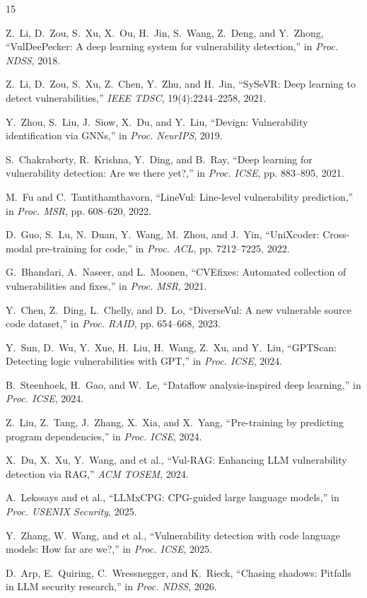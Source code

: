 \documentclass[10pt,twocolumn]{article}
\begin{document}
\footnotesize
\begin{thebibliography}{15}
\setlength{\itemsep}{0.2pt}
\setlength{\parskip}{0pt}

Z.~Li, D.~Zou, S.~Xu, X.~Ou, H.~Jin, S.~Wang, Z.~Deng, and Y.~Zhong, ``VulDeePecker: A deep learning system for vulnerability detection,'' in \emph{Proc. NDSS}, 2018.

Z.~Li, D.~Zou, S.~Xu, Z.~Chen, Y.~Zhu, and H.~Jin, ``SySeVR: Deep learning to detect vulnerabilities,'' \emph{IEEE TDSC}, 19(4):2244--2258, 2021.

Y.~Zhou, S.~Liu, J.~Siow, X.~Du, and Y.~Liu, ``Devign: Vulnerability identification via GNNs,'' in \emph{Proc. NeurIPS}, 2019.

S.~Chakraborty, R.~Krishna, Y.~Ding, and B.~Ray, ``Deep learning for vulnerability detection: Are we there yet?,'' in \emph{Proc. ICSE}, pp. 883--895, 2021.

M.~Fu and C.~Tantithamthavorn, ``LineVul: Line-level vulnerability prediction,'' in \emph{Proc. MSR}, pp. 608--620, 2022.

D.~Guo, S.~Lu, N.~Duan, Y.~Wang, M.~Zhou, and J.~Yin, ``UniXcoder: Cross-modal pre-training for code,'' in \emph{Proc. ACL}, pp. 7212--7225, 2022.

G.~Bhandari, A.~Naseer, and L.~Moonen, ``CVEfixes: Automated collection of vulnerabilities and fixes,'' in \emph{Proc. MSR}, 2021.

Y.~Chen, Z.~Ding, L.~Chelly, and D.~Lo, ``DiverseVul: A new vulnerable source code dataset,'' in \emph{Proc. RAID}, pp. 654--668, 2023.

Y.~Sun, D.~Wu, Y.~Xue, H.~Liu, H.~Wang, Z.~Xu, and Y.~Liu, ``GPTScan: Detecting logic vulnerabilities with GPT,'' in \emph{Proc. ICSE}, 2024.

B.~Steenhoek, H.~Gao, and W.~Le, ``Dataflow analysis-inspired deep learning,'' in \emph{Proc. ICSE}, 2024.

Z.~Liu, Z.~Tang, J.~Zhang, X.~Xia, and X.~Yang, ``Pre-training by predicting program dependencies,'' in \emph{Proc. ICSE}, 2024.

X.~Du, X.~Xu, Y.~Wang, and et al., ``Vul-RAG: Enhancing LLM vulnerability detection via RAG,'' \emph{ACM TOSEM}, 2024.

A.~Lekssays and et al., ``LLMxCPG: CPG-guided large language models,'' in \emph{Proc. USENIX Security}, 2025.

Y.~Zhang, W.~Wang, and et al., ``Vulnerability detection with code language models: How far are we?,'' in \emph{Proc. ICSE}, 2025.

D.~Arp, E.~Quiring, C.~Wressnegger, and K.~Rieck, ``Chasing shadows: Pitfalls in LLM security research,'' in \emph{Proc. NDSS}, 2026.

\end{thebibliography}
\end{document}
